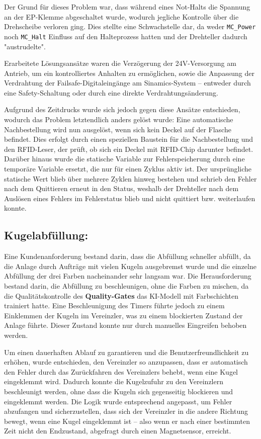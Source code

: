 Der Grund für dieses Problem war, dass während eines Not-Halts die Spannung an der EP-Klemme abgeschaltet wurde, wodurch jegliche Kontrolle über die Drehscheibe verloren ging. Dies stellte eine Schwachstelle dar, da weder \texttt{MC\_Power} noch \texttt{MC\_Halt} Einfluss auf den Halteprozess hatten und der Drehteller dadurch "austrudelte".  

Erarbeitete Lösungsansätze waren die Verzögerung der 24V-Versorgung am Antrieb, um ein kontrolliertes Anhalten zu ermöglichen, sowie die Anpassung der Verdrahtung der Failsafe-Digitaleingänge am Sinamics-System – entweder durch eine Safety-Schaltung oder durch eine direkte Verdrahtungsänderung.  

Aufgrund des Zeitdrucks wurde sich jedoch gegen diese Ansätze entschieden, wodurch das Problem letztendlich anders gelöst wurde: Eine automatische Nachbestellung wird nun ausgelöst, wenn sich kein Deckel auf der Flasche befindet. Dies erfolgt durch einen speziellen Baustein für die Nachbestellung und den RFID-Leser, der prüft, ob sich ein Deckel mit RFID-Chip darunter befindet. Darüber hinaus wurde die statische Variable zur Fehlerspeicherung durch eine temporäre Variable ersetzt, die nur für einen Zyklus aktiv ist. Der ursprüngliche statische Wert blieb über mehrere Zyklen hinweg bestehen und schrieb den Fehler nach dem Quittieren erneut in den Status, weshalb der Drehteller nach dem Auslösen eines Fehlers im Fehlerstatus blieb und nicht quittiert bzw. weiterlaufen konnte.
\subsection{Kugelabfüllung:} 
Eine Kundenanforderung bestand darin, dass die Abfüllung schneller abfüllt, da die Anlage durch Aufträge mit vielen Kugeln ausgebremst wurde und die einzelne Abfüllung der drei Farben nacheinander sehr langsam war. Die Herausforderung bestand darin, die Abfüllung zu beschleunigen, ohne die Farben zu mischen, da die Qualitätskontrolle des \textbf{Quality-Gates} das KI-Modell mit Farbschichten trainiert hatte. Eine Beschleunigung des Timers führte jedoch zu einem Einklemmen der Kugeln im Vereinzler, was zu einem blockierten Zustand der Anlage führte. Dieser Zustand konnte nur durch manuelles Eingreifen behoben werden.  

Um einen dauerhaften Ablauf zu garantieren und die Benutzerfreundlichkeit zu erhöhen, wurde entschieden, den Vereinzler so anzupassen, dass er automatisch den Fehler durch das Zurückfahren des Vereinzlers behebt, wenn eine Kugel eingeklemmt wird. Dadurch konnte die Kugelzufuhr zu den Vereinzlern beschleunigt werden, ohne dass die Kugeln sich gegenseitig blockieren und eingeklemmt werden. Die Logik wurde entsprechend angepasst, um Fehler abzufangen und sicherzustellen, dass sich der Vereinzler in die andere Richtung bewegt, wenn eine Kugel eingeklemmt ist – also wenn er nach einer bestimmten Zeit nicht den Endzustand, abgefragt durch einen Magnetsensor, erreicht.  

